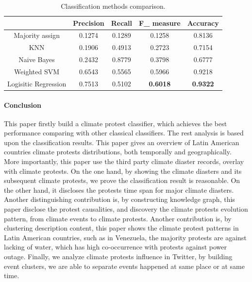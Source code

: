 \documentclass[9pt,twocolumn,twoside]{pnas-new}
\begin{document}
{\begin{table}[!ht]
\small
\caption{Classification methods comparison.}
\vspace{0.5em}
\centering
\begin{tabular}{|c | c | c | c | c |}
\hline
 & \textbf{Precision} & \textbf{Recall} & \textbf{F\_ measure} & \textbf{Accuracy}  \\ [1ex]
\hline
Majority assign   &  0.1274  &  0.1289 &  0.1258 &  0.8136  \\[1ex]
\hline
KNN &  0.1906  & 0.4913 &  0.2723 &  0.7154  \\[1ex]
\hline
Naive Bayes &  0.2432 & 0.8779 &  0.3798 &  0.6777  \\[1ex]
\hline
Weighted SVM &  0.6543 &  0.5565 & 0.5966 &  0.9218  \\[1ex]
\hline
Logisitic Regression & 0.7513 &  0.5102 &  \textbf{0.6018}&  \textbf{0.9322}  \\[1ex]
\hline
\end{tabular}
\label{table:comparision}
\end{table}


\paragraph{Conclusion} This paper firstly build a climate protest classifier, which achieves the best performance comparing with other classical classifiers. The rest analysis is based upon the classification results. This paper gives an overview of Latin American countries climate protests distributions, both temporally and geographically. More importantly, this paper use the third party climate diaster records, overlay with climate protests. On the one hand, by showing the climate diasters and its subsequent climate protests, we prove the classification result is reasonable. On the other hand, it discloses the protests time span for major climate diasters. Another distinguishing contribution is, by constructing knowledge graph, this paper disclose the protest causalities, and discovery the climate protests evolution pattern, from climate events to climate protests. Another contribution is, by clustering description content, this paper shows the climate protest patterns in Latin American countries, such as in Venezuela, the majority protests are against lacking of water, which has high co-occurrence with protests against power outage. Finally, we analyze climate protests influence in Twitter, by building event clusters, we are able to separate events happened at same place or at same time.

}
\end{document}
